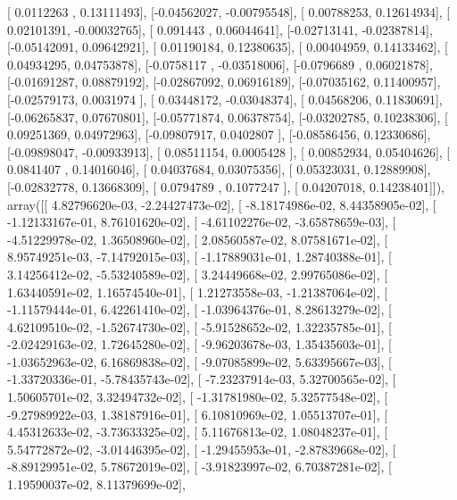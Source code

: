 \documentclass{article}
\begin{document}
       [ 0.0112263 ,  0.13111493],
       [-0.04562027, -0.00795548],
       [ 0.00788253,  0.12614934],
       [ 0.02101391, -0.00032765],
       [ 0.091443  ,  0.06044641],
       [-0.02713141, -0.02387814],
       [-0.05142091,  0.09642921],
       [ 0.01190184,  0.12380635],
       [ 0.00404959,  0.14133462],
       [ 0.04934295,  0.04753878],
       [-0.0758117 , -0.03518006],
       [-0.0796689 ,  0.06021878],
       [-0.01691287,  0.08879192],
       [-0.02867092,  0.06916189],
       [-0.07035162,  0.11400957],
       [-0.02579173,  0.0031974 ],
       [ 0.03448172, -0.03048374],
       [ 0.04568206,  0.11830691],
       [-0.06265837,  0.07670801],
       [-0.05771874,  0.06378754],
       [-0.03202785,  0.10238306],
       [ 0.09251369,  0.04972963],
       [-0.09807917,  0.0402807 ],
       [-0.08586456,  0.12330686],
       [-0.09898047, -0.00933913],
       [ 0.08511154,  0.0005428 ],
       [ 0.00852934,  0.05404626],
       [ 0.0841407 ,  0.14016046],
       [ 0.04037684,  0.03075356],
       [ 0.05323031,  0.12889908],
       [-0.02832778,  0.13668309],
       [ 0.0794789 ,  0.1077247 ],
       [ 0.04207018,  0.14238401]]), array([[  4.82796620e-03,  -2.24427473e-02],
       [ -8.18174986e-02,   8.44358905e-02],
       [ -1.12133167e-01,   8.76101620e-02],
       [ -4.61102276e-02,  -3.65878659e-03],
       [ -4.51229978e-02,   1.36508960e-02],
       [  2.08560587e-02,   8.07581671e-02],
       [  8.95749251e-03,  -7.14792015e-03],
       [ -1.17889031e-01,   1.28740388e-01],
       [  3.14256412e-02,  -5.53240589e-02],
       [  3.24449668e-02,   2.99765086e-02],
       [  1.63440591e-02,   1.16574540e-01],
       [  1.21273558e-03,  -1.21387064e-02],
       [ -1.11579444e-01,   6.42261410e-02],
       [ -1.03964376e-01,   8.28613279e-02],
       [  4.62109510e-02,  -1.52674730e-02],
       [ -5.91528652e-02,   1.32235785e-01],
       [ -2.02429163e-02,   1.72645280e-02],
       [ -9.96203678e-03,   1.35435603e-01],
       [ -1.03652963e-02,   6.16869838e-02],
       [ -9.07085899e-02,   5.63395667e-03],
       [ -1.33720336e-01,  -5.78435743e-02],
       [ -7.23237914e-03,   5.32700565e-02],
       [  1.50605701e-02,   3.32494732e-02],
       [ -1.31781980e-02,   5.32577548e-02],
       [ -9.27989922e-03,   1.38187916e-01],
       [  6.10810969e-02,   1.05513707e-01],
       [  4.45312633e-02,  -3.73633325e-02],
       [  5.11676813e-02,   1.08048237e-01],
       [  5.54772872e-02,  -3.01446395e-02],
       [ -1.29455953e-01,  -2.87839668e-02],
       [ -8.89129951e-02,   5.78672019e-02],
       [ -3.91823997e-02,   6.70387281e-02],
       [  1.19590037e-02,   8.11379699e-02],
\end{document}
